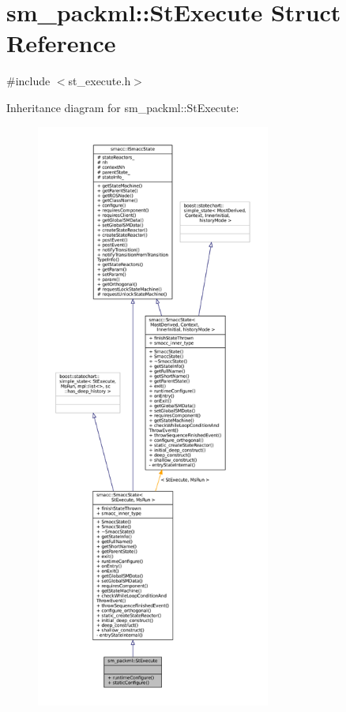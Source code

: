 \hypertarget{structsm__packml_1_1StExecute}{}\section{sm\+\_\+packml\+:\+:St\+Execute Struct Reference}
\label{structsm__packml_1_1StExecute}


{\ttfamily \#include $<$st\+\_\+execute.\+h$>$}



Inheritance diagram for sm\+\_\+packml\+:\+:St\+Execute\+:
\nopagebreak
\begin{figure}[H]
\begin{center}
\leavevmode
\includegraphics[height=550pt]{structsm__packml_1_1StExecute__inherit__graph}
\end{center}
\end{figure}



